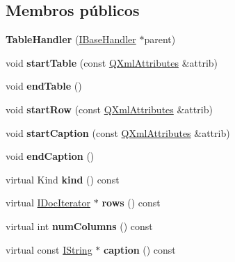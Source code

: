 \subsection*{Membros públicos}
\begin{DoxyCompactItemize}
\item 
\hypertarget{class_table_handler_aba3163abfdaab81d31be910f7afdaa42}{{\bfseries Table\-Handler} (\hyperlink{class_i_base_handler}{I\-Base\-Handler} $\ast$parent)}\label{class_table_handler_aba3163abfdaab81d31be910f7afdaa42}

\item 
\hypertarget{class_table_handler_a05b0128d8f0df55bae16f87e5091adcc}{void {\bfseries start\-Table} (const \hyperlink{class_q_xml_attributes}{Q\-Xml\-Attributes} \&attrib)}\label{class_table_handler_a05b0128d8f0df55bae16f87e5091adcc}

\item 
\hypertarget{class_table_handler_a1d2e73359f06aa572871811f2523cf8a}{void {\bfseries end\-Table} ()}\label{class_table_handler_a1d2e73359f06aa572871811f2523cf8a}

\item 
\hypertarget{class_table_handler_a5407854e868c694b4f88e5211f863b0f}{void {\bfseries start\-Row} (const \hyperlink{class_q_xml_attributes}{Q\-Xml\-Attributes} \&attrib)}\label{class_table_handler_a5407854e868c694b4f88e5211f863b0f}

\item 
\hypertarget{class_table_handler_a3efaaa8f455627e191564d6dc3ca3b22}{void {\bfseries start\-Caption} (const \hyperlink{class_q_xml_attributes}{Q\-Xml\-Attributes} \&attrib)}\label{class_table_handler_a3efaaa8f455627e191564d6dc3ca3b22}

\item 
\hypertarget{class_table_handler_a8c1fb14094b9f15962dd89015aba944a}{void {\bfseries end\-Caption} ()}\label{class_table_handler_a8c1fb14094b9f15962dd89015aba944a}

\item 
\hypertarget{class_table_handler_af8e62c8a81ddf2283205cc8955de50eb}{virtual Kind {\bfseries kind} () const }\label{class_table_handler_af8e62c8a81ddf2283205cc8955de50eb}

\item 
\hypertarget{class_table_handler_ae9eddf9a941dd18063862ac2189c2197}{virtual \hyperlink{class_i_doc_iterator}{I\-Doc\-Iterator} $\ast$ {\bfseries rows} () const }\label{class_table_handler_ae9eddf9a941dd18063862ac2189c2197}

\item 
\hypertarget{class_table_handler_a6cde07f7b6b175e93081147a45b90d6a}{virtual int {\bfseries num\-Columns} () const }\label{class_table_handler_a6cde07f7b6b175e93081147a45b90d6a}

\item 
\hypertarget{class_table_handler_a044136005e1897ffcdd89f6c73c25c80}{virtual const \hyperlink{class_i_string}{I\-String} $\ast$ {\bfseries caption} () const }\label{class_table_handler_a044136005e1897ffcdd89f6c73c25c80}

\end{DoxyCompactItemize}
